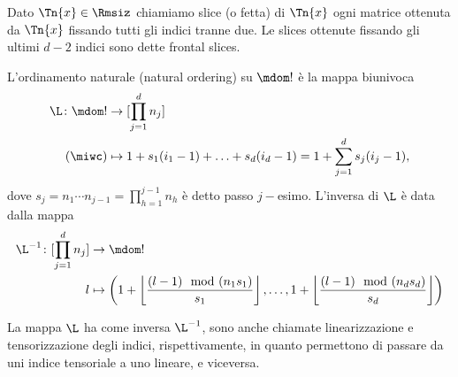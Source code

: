 \begin{definition}
  Dato $ \Tn{x} \in \Rmsiz $ chiamiamo slice (o fetta) di $ \Tn{x} $ ogni matrice ottenuta da $
  \Tn{x} $ fissando tutti gli indici tranne due. Le slices ottenute fissando gli ultimi $ d-2 $ indici sono dette frontal slices.
\end{definition}



\begin{definition}
  L'ordinamento naturale (natural ordering) su $ \mdom! $ è la mappa biunivoca
\begin{equation*}
  \begin{aligned}
    \L \colon \mdom! &\to [\prod_{j=1}^d n_j]\\
    (\miwc) &\mapsto 1 + s_1 (i_1-1) + \ldots + s_d(i_d-1) = 1 + \sum_{j=1}^d s_j(i_j - 1),
  \end{aligned}
\end{equation*}
dove $ s_j = n_1 \cdots n_{j-1} = \prod_{h=1}^{j-1}n_h $ è detto passo $ j- $esimo.
L'inversa di $ \L $ è data dalla mappa
\begin{equation*}
  \begin{aligned}
    \L^{-1} \colon [\prod_{j=1}^d n_j] &\to \mdom!\\
    l &\mapsto \left(1 + \left\lfloor \frac{ (l-1)\mod(n_1s_1)}{s_1}\right\rfloor, \ldots, 1 +
    \left\lfloor \frac{ (l-1)\mod(n_ds_d)}{s_d} \right\rfloor \right)
  \end{aligned}
\end{equation*}
\end{definition}
\begin{remark}
  La mappa $ \L $ ha come inversa $ \L^{-1} $, sono anche chiamate linearizzazione e tensorizzazione
  degli indici, rispettivamente, in quanto permettono di passare da uni indice tensoriale a uno
  lineare, e viceversa.
\end{remark}
